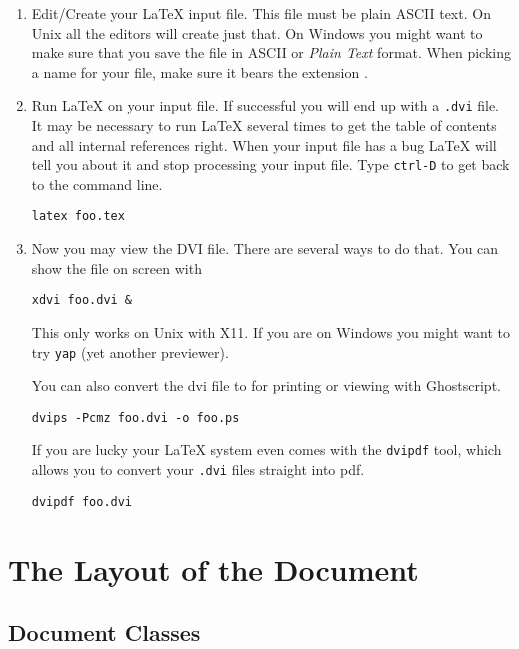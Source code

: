 \begin{enumerate}
\item 
  
  Edit/Create your \LaTeX{} input file. This file must be plain ASCII
  text.  On Unix all the editors will create just that. On Windows you
  might want to make sure that you save the file in ASCII or
  \emph{Plain Text} format.  When picking a name for your file, make
  sure it bears the extension .

\item 

Run \LaTeX{} on your input file. If successful you will end up with a
\texttt{.dvi} file. It may be necessary to run \LaTeX{} several times to get
the table of contents and all internal references right. When your input
file has a bug \LaTeX{} will tell you about it and stop processing your
input file. Type \texttt{ctrl-D} to get back to the command line.
\begin{lscommand}
\verb+latex foo.tex+
\end{lscommand}

\item 
Now you may view the DVI file. There are several ways to do that. You can show the file on screen with
\begin{lscommand}
\verb+xdvi foo.dvi &+
\end{lscommand}
This only works on Unix with X11. If you are on Windows you might want to try \texttt{yap} (yet another previewer).

You can also convert the dvi file to \PSi{} for printing or viewing with Ghostscript.
\begin{lscommand}
\verb+dvips -Pcmz foo.dvi -o foo.ps+
\end{lscommand}

If you are lucky your \LaTeX{} system even comes with the \texttt{dvipdf} tool, which allows
you to convert your \texttt{.dvi} files straight into pdf.
\begin{lscommand}
\verb+dvipdf foo.dvi+
\end{lscommand}

\end{enumerate}

 
\section{The Layout of the Document}
 
\subsection {Document Classes}\label{sec:documentclass}

